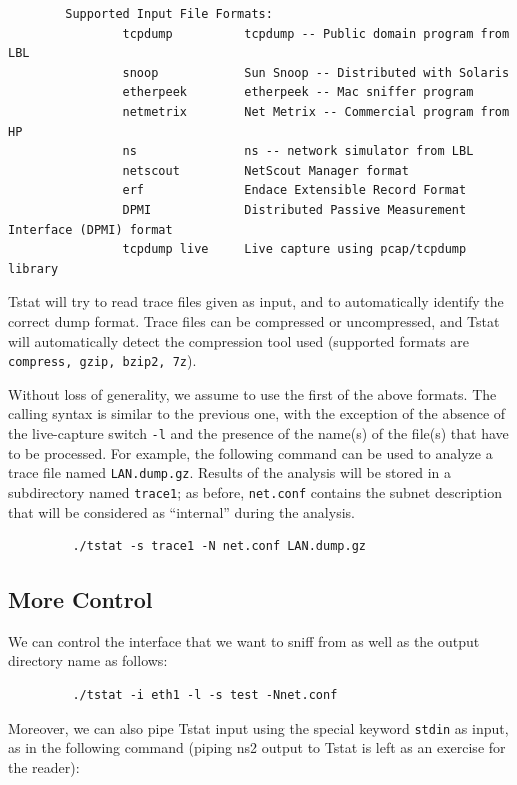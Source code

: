 \documentclass[11pt]{article}
\begin{document}
\begin{small}\begin{verbatim}
        Supported Input File Formats:
                tcpdump          tcpdump -- Public domain program from LBL
                snoop            Sun Snoop -- Distributed with Solaris
                etherpeek        etherpeek -- Mac sniffer program
                netmetrix        Net Metrix -- Commercial program from HP
                ns               ns -- network simulator from LBL
                netscout         NetScout Manager format
                erf              Endace Extensible Record Format
                DPMI             Distributed Passive Measurement Interface (DPMI) format
                tcpdump live     Live capture using pcap/tcpdump library
\end{verbatim}\end{small} \noindent
Tstat will try to read trace files given as input, and to automatically identify
the correct dump format. Trace files can be compressed or uncompressed, and
Tstat will automatically detect the compression tool used (supported formats are
\texttt{compress, gzip, bzip2, 7z}).



Without loss of generality, we assume to use the first of the above formats. The
calling syntax is similar to the previous one, with the exception of the absence
of the live-capture switch \texttt{-l} and the presence of the name(s) of the file(s)
that have to be processed. For example, the following command can be used to
analyze a trace file named \texttt{LAN.dump.gz}. Results of the analysis
will be stored in a subdirectory named \texttt{trace1}; as before, \texttt{net.conf} contains  the
subnet description that will be considered as ``internal'' during the
analysis.

\begin{small}\begin{verbatim}
         ./tstat -s trace1 -N net.conf LAN.dump.gz
\end{verbatim}\end{small} \noindent
\subsection{More Control\label{More_Control}}


We can control the interface that we want to sniff from as well as
the output directory name as follows:

\begin{small}\begin{verbatim}
         ./tstat -i eth1 -l -s test -Nnet.conf
\end{verbatim}\end{small} \noindent
Moreover, we can also pipe Tstat input using the special keyword
\texttt{stdin} as input, as in the following command (piping ns2 output to 
Tstat is left as an exercise for the reader):
\end{document}
